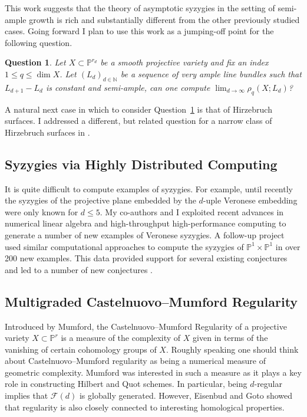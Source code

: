 \documentclass[11pt,reqno]{amsart}
\newtheorem{question}[lemma]{Question}
\theoremstyle{remark}
\newcommand{\cF}{\mathcal{F}}
\newcommand{\N}{\mathbb{N}}
\renewcommand{\P}{\mathbb{P}}
\begin{document}
This work suggests that the theory of asymptotic syzygies in the setting of semi-ample growth is rich and substantially different from the other previously studied cases. Going forward I plan to use this work as a jumping-off point for the following question.  

\begin{question}\label{quest:semi-ample}
Let $X\subset \P^{r_d}$ be a smooth projective variety and fix an index $1\leq q \leq \dim X$. Let $(L_{d})_{d\in\N}$ be a sequence of very ample line bundles such that $L_{d+1}-L_{d}$ is constant and semi-ample, can one compute $\lim_{d\to\infty} \rho_{q}\left(X;L_{d}\right)$?
\end{question}

A natural next case in which to consider Question~\ref{quest:semi-ample} is that of Hirzebruch surfaces. I addressed a different, but related question for a narrow class of Hirzebruch surfaces in \cite{bruce19-hirzebruch}.

\subsection{Syzygies via Highly Distributed Computing}

It is quite difficult to compute examples of syzygies. For example, until recently the syzygies of the projective plane embedded by the $d$-uple Veronese embedding were only known for $d\leq 5$. My co-authors and I exploited recent advances in numerical linear algebra and high-throughput high-performance computing to generate a number of new examples of Veronese syzygies. A follow-up project used similar computational approaches to compute the syzygies of $\P^{1}\times\P^{1}$ in over 200 new examples. This data provided support for several existing conjectures and led to a number of new conjectures \cite{bruceErmanGoldsteinYang18,bruceErman19,BCEGLY22}.  %


\subsection{Multigraded Castelnuovo–Mumford Regularity}\label{subsec:prior-mgreg}

Introduced by Mumford, the Castelnuovo–Mumford Regularity of a projective variety $X\subset \P^{r}$ is a measure of the complexity of $X$ given in terms of the vanishing of certain cohomology groups of $X$. Roughly speaking one should think about Castelnuovo--Mumford regularity as being a numerical measure of geometric complexity. Mumford was interested in such a measure as it plays a key role in constructing Hilbert and Quot schemes. In particular, being $d$-regular implies that $\cF(d)$ is globally generated. However, Eisenbud and Goto showed that regularity is also closely connected to interesting homological properties.
\end{document}
